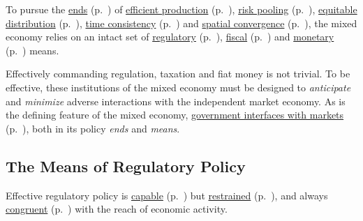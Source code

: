 To pursue the \hyperref[sec:ends]{ends} (p.~\pageref{sec:ends}) of \hyperref[sec:production]{efficient production} (p.~\pageref{sec:production}), \hyperref[sec:risk]{risk pooling} (p.~\pageref{sec:risk}), \hyperref[sec:distribution]{equitable distribution} (p.~\pageref{sec:distribution}), \hyperref[sec:time]{time consistency} (p.~\pageref{sec:time}) and \hyperref[sec:space]{spatial convergence} (p.~\pageref{sec:space}), the mixed economy relies on an intact set of \hyperref[sec:regulatory]{regulatory} (p.~\pageref{sec:regulatory}), \hyperref[sec:fiscal]{fiscal} (p.~\pageref{sec:fiscal}) and \hyperref[sec:monetary]{monetary} (p.~\pageref{sec:monetary}) means.

Effectively commanding regulation, taxation and fiat money is not trivial.
To be effective, these institutions of the mixed economy must be designed to \emph{anticipate} and \emph{minimize} adverse interactions with the independent market economy.
As is the defining feature of the mixed economy, \hyperref[sec:interface]{government interfaces with markets} (p.~\pageref{sec:interface}), both in its policy \emph{ends} and \emph{means}.

\subsection[Regulatory Policy]{The Means of Regulatory Policy}
	\label{sec:regulatory}

Effective regulatory policy is \hyperref[itm:capability]{capable} (p.~\pageref{itm:capability}) but \hyperref[itm:restraint]{restrained} (p.~\pageref{itm:restraint}), and always \hyperref[itm:congruence]{congruent} (p.~\pageref{itm:congruence}) with the reach of economic activity.

